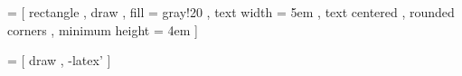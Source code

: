  = [
    rectangle
    , draw
    , fill = gray!20
    , text width = 5em
    , text centered
    , rounded corners
    , minimum height = 4em
]

 = [
    draw
    , -latex'
]
